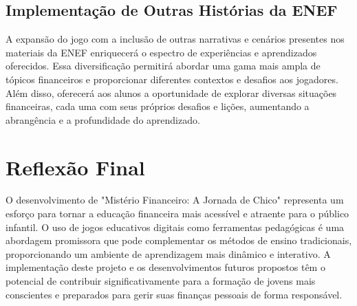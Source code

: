 \subsection*{Implementação de Outras Histórias da ENEF}
A expansão do jogo com a inclusão de outras narrativas e cenários presentes nos materiais da ENEF enriquecerá o espectro de experiências e aprendizados oferecidos. Essa diversificação permitirá abordar uma gama mais ampla de tópicos financeiros e proporcionar diferentes contextos e desafios aos jogadores. Além disso, oferecerá aos alunos a oportunidade de explorar diversas situações financeiras, cada uma com seus próprios desafios e lições, aumentando a abrangência e a profundidade do aprendizado.

\section{Reflexão Final}
O desenvolvimento de "Mistério Financeiro: A Jornada de Chico" representa um esforço para tornar a educação financeira mais acessível e atraente para o público infantil. O uso de jogos educativos digitais como ferramentas pedagógicas é uma abordagem promissora que pode complementar os métodos de ensino tradicionais, proporcionando um ambiente de aprendizagem mais dinâmico e interativo. A implementação deste projeto e os desenvolvimentos futuros propostos têm o potencial de contribuir significativamente para a formação de jovens mais conscientes e preparados para gerir suas finanças pessoais de forma responsável.
